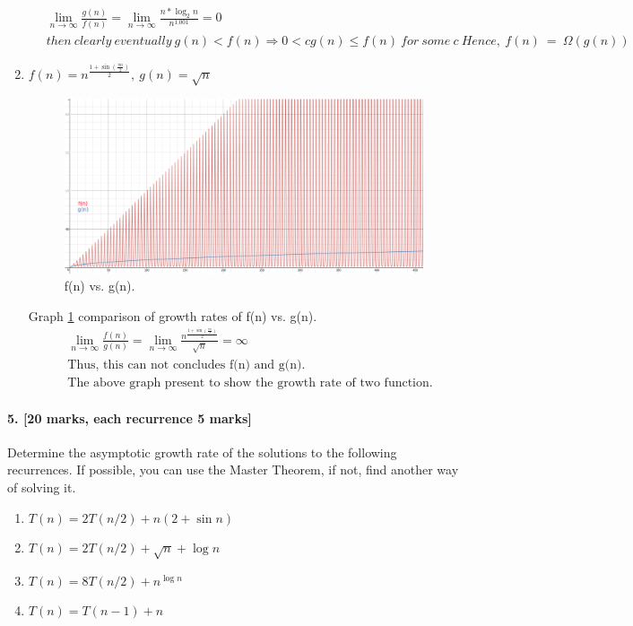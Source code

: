 \documentclass[a4paper]{scrartcl}
\begin{document}
\begin{enumerate}[label=(\alph*)]
\begin{align*}
    &\ \lim_{n\to\infty} \frac{g(n)}{f(n)}=\lim_{n\to\infty} \frac{n*\log_2{n}}{n^{1.001}}=0\\ &\
    then\ clearly\ eventually\ g(n)<f(n)\Rightarrow 0<cg(n)\leq f(n)\ for\ some\ c\ Hence,\ f(n)\ =\ \Omega(g(n))
  \end{align*}
  \item $f(n)=n^{\frac{1+\sin(\frac{\pi n}{2})}{2}},\ g(n)=\sqrt{n}$
  \begin{figure}[h!]
    \includegraphics[width=\linewidth]{f(n)-vs-g(n).png}
    \caption{f(n) vs. g(n).}
    \label{fig:f(n)-vs-g(n)}
  \end{figure}
  Graph \ref{fig:f(n)-vs-g(n)} comparison of growth rates of f(n) vs. g(n).
  \begin{align*}
    &\ \lim_{n\to\infty} \frac{f(n)}{g(n)}=\lim_{n\to\infty} \frac{n^{\frac{1+\sin(\frac{\pi n}{2})}{2}}}{\sqrt{n}}=\infty\\ &\
    \text{Thus, this can not concludes f(n) and g(n).}\\ &\
    \text{The above graph present to show the growth rate of two function.}
  \end{align*}
\end{enumerate}
\paragraph{5. [20 marks, each recurrence 5 marks]}
\label{sec:Question 5}
Determine the asymptotic growth rate of the solutions to the following recurrences. If possible, you can use the Master Theorem, if not, find another way of solving it.
\begin{enumerate}[label=(\alph*)]
  \item $T (n) = 2T (n/2) + n(2 + \sin{n})$
  \item $T (n) = 2T (n/2) + \sqrt{n} + \log{n}$
  \item $T (n) = 8T (n/2) + n^{\log{n}}$
  \item $T (n) = T (n − 1) + n$
\end{enumerate}
\end{document}
